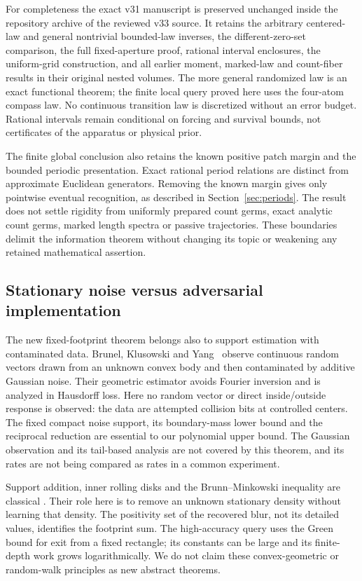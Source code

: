 For completeness the exact v31 manuscript is preserved unchanged
inside the repository archive of the reviewed v33 source. It retains the arbitrary centered-law and general
nontrivial bounded-law inverses, the different-zero-set comparison,
the full fixed-aperture proof, rational interval enclosures, the
uniform-grid construction, and all earlier moment, marked-law and
count-fiber results in their original nested volumes. The more general
randomized law is an exact functional theorem; the finite local query
proved here uses the four-atom compass law. No continuous transition
law is discretized without an error budget. Rational intervals remain
conditional on forcing and survival bounds, not certificates of the
apparatus or physical prior.

The finite global conclusion also retains the known positive patch
margin and the bounded periodic presentation. Exact rational period
relations are distinct from approximate Euclidean generators. Removing
the known margin gives only pointwise eventual recognition, as described
in Section~\ref{sec:periods}. The result does not settle rigidity from
uniformly prepared count germs, exact analytic count germs, marked
length spectra or passive trajectories. These boundaries delimit the
information theorem without changing its topic or weakening any retained
mathematical assertion.

\subsection{Stationary noise versus adversarial implementation}
The new fixed-footprint theorem belongs also to support estimation with
contaminated data. Brunel, Klusowski and Yang~\cite{BKY} observe
continuous random vectors drawn from an unknown convex body and then
contaminated by additive Gaussian noise. Their geometric estimator
avoids Fourier inversion and is analyzed in Hausdorff loss. Here no
random vector or direct inside/outside response is observed: the data
are attempted collision bits at controlled centers. The fixed compact
noise support, its boundary-mass lower bound and the reciprocal reduction
are essential to our polynomial upper bound. The Gaussian observation
and its tail-based analysis are not covered by this theorem, and its
rates are not being compared as rates in a common experiment.

Support addition, inner rolling disks and the Brunn--Minkowski inequality
are classical \cite{Schneider}. Their role here is to remove an unknown
stationary density without learning that density. The positivity set of
the recovered blur, not its detailed values, identifies the footprint
sum. The high-accuracy query uses the Green bound for exit from a fixed
rectangle; its constants can be large and its finite-depth work grows
logarithmically. We do not claim these convex-geometric or random-walk
principles as new abstract theorems.

